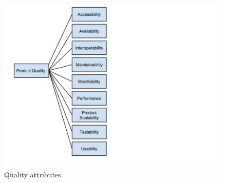 \begin{figure}[!ht]
    \begin{center}
    \includegraphics[scale=0.4]{images/qualityAttributes.jpg}
    \caption{Quality attributes.}
    \label{img:qualityAttributes}
    \end{center}
\end{figure}